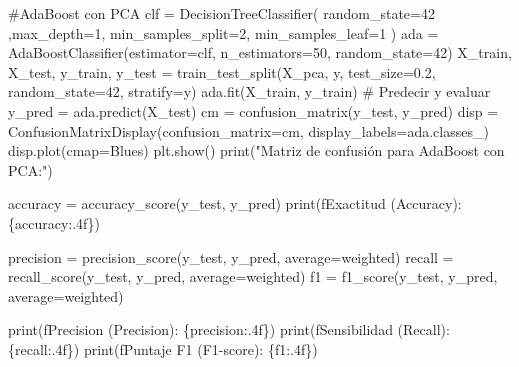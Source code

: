 \documentclass[
  letterpaper,
  DIV=11,
  numbers=noendperiod]{scrartcl}
\newenvironment{Shaded}{\begin{snugshade}}{\end{snugshade}}
\newcommand{\BuiltInTok}[1]{\textcolor[rgb]{0.00,0.23,0.31}{#1}}
\newcommand{\CommentTok}[1]{\textcolor[rgb]{0.37,0.37,0.37}{#1}}
\newcommand{\DecValTok}[1]{\textcolor[rgb]{0.68,0.00,0.00}{#1}}
\newcommand{\FloatTok}[1]{\textcolor[rgb]{0.68,0.00,0.00}{#1}}
\newcommand{\NormalTok}[1]{\textcolor[rgb]{0.00,0.23,0.31}{#1}}
\newcommand{\OperatorTok}[1]{\textcolor[rgb]{0.37,0.37,0.37}{#1}}
\newcommand{\SpecialCharTok}[1]{\textcolor[rgb]{0.37,0.37,0.37}{#1}}
\newcommand{\SpecialStringTok}[1]{\textcolor[rgb]{0.13,0.47,0.30}{#1}}
\newcommand{\StringTok}[1]{\textcolor[rgb]{0.13,0.47,0.30}{#1}}
\begin{document}
\begin{Shaded}
\begin{Highlighting}[]
\CommentTok{\#AdaBoost con PCA}
\NormalTok{clf }\OperatorTok{=}\NormalTok{ DecisionTreeClassifier(}
\NormalTok{  random\_state}\OperatorTok{=}\DecValTok{42}\NormalTok{ ,max\_depth}\OperatorTok{=}\DecValTok{1}\NormalTok{,}
\NormalTok{  min\_samples\_split}\OperatorTok{=}\DecValTok{2}\NormalTok{,}
\NormalTok{  min\_samples\_leaf}\OperatorTok{=}\DecValTok{1}
\NormalTok{)}
\NormalTok{ada }\OperatorTok{=}\NormalTok{ AdaBoostClassifier(estimator}\OperatorTok{=}\NormalTok{clf, n\_estimators}\OperatorTok{=}\DecValTok{50}\NormalTok{, random\_state}\OperatorTok{=}\DecValTok{42}\NormalTok{)}
\NormalTok{X\_train, X\_test, y\_train, y\_test }\OperatorTok{=}
\NormalTok{train\_test\_split(X\_pca, y, test\_size}\OperatorTok{=}\FloatTok{0.2}\NormalTok{, random\_state}\OperatorTok{=}\DecValTok{42}\NormalTok{, stratify}\OperatorTok{=}\NormalTok{y)}
\NormalTok{ada.fit(X\_train, y\_train)}
\CommentTok{\# Predecir y evaluar}
\NormalTok{y\_pred }\OperatorTok{=}\NormalTok{ ada.predict(X\_test)}
\NormalTok{cm }\OperatorTok{=}\NormalTok{ confusion\_matrix(y\_test, y\_pred)}
\NormalTok{disp }\OperatorTok{=}\NormalTok{ ConfusionMatrixDisplay(confusion\_matrix}\OperatorTok{=}\NormalTok{cm, display\_labels}\OperatorTok{=}\NormalTok{ada.classes\_)}
\NormalTok{disp.plot(cmap}\OperatorTok{=}\StringTok{\textquotesingle{}Blues\textquotesingle{}}\NormalTok{)}
\NormalTok{plt.show()}
\BuiltInTok{print}\NormalTok{(}\StringTok{"Matriz de confusión para AdaBoost con PCA:"}\NormalTok{)}

\NormalTok{accuracy }\OperatorTok{=}\NormalTok{ accuracy\_score(y\_test, y\_pred)}
\BuiltInTok{print}\NormalTok{(}\SpecialStringTok{f\textquotesingle{}Exactitud (Accuracy): }\SpecialCharTok{\{}\NormalTok{accuracy}\SpecialCharTok{:.4f\}}\SpecialStringTok{\textquotesingle{}}\NormalTok{)}

\NormalTok{precision }\OperatorTok{=}\NormalTok{ precision\_score(y\_test, y\_pred, average}\OperatorTok{=}\StringTok{\textquotesingle{}weighted\textquotesingle{}}\NormalTok{)}
\NormalTok{recall }\OperatorTok{=}\NormalTok{ recall\_score(y\_test, y\_pred, average}\OperatorTok{=}\StringTok{\textquotesingle{}weighted\textquotesingle{}}\NormalTok{)}
\NormalTok{f1 }\OperatorTok{=}\NormalTok{ f1\_score(y\_test, y\_pred, average}\OperatorTok{=}\StringTok{\textquotesingle{}weighted\textquotesingle{}}\NormalTok{)}

\BuiltInTok{print}\NormalTok{(}\SpecialStringTok{f\textquotesingle{}Precision (Precision): }\SpecialCharTok{\{}\NormalTok{precision}\SpecialCharTok{:.4f\}}\SpecialStringTok{\textquotesingle{}}\NormalTok{)}
\BuiltInTok{print}\NormalTok{(}\SpecialStringTok{f\textquotesingle{}Sensibilidad (Recall): }\SpecialCharTok{\{}\NormalTok{recall}\SpecialCharTok{:.4f\}}\SpecialStringTok{\textquotesingle{}}\NormalTok{)}
\BuiltInTok{print}\NormalTok{(}\SpecialStringTok{f\textquotesingle{}Puntaje F1 (F1{-}score): }\SpecialCharTok{\{}\NormalTok{f1}\SpecialCharTok{:.4f\}}\SpecialStringTok{\textquotesingle{}}\NormalTok{)}
\end{Highlighting}
\end{Shaded}
\end{document}
